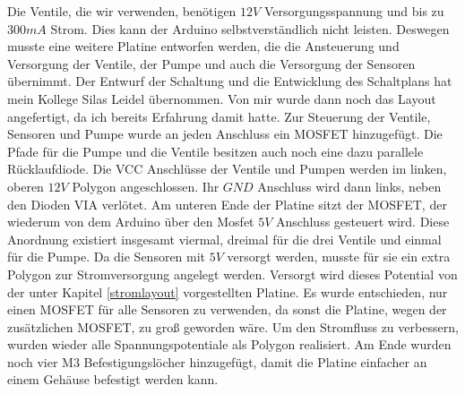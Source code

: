 Die Ventile, die wir verwenden, benötigen $12V$ Versorgungsspannung und bis zu $300mA$
Strom. Dies kann der Arduino selbstverständlich nicht leisten. Deswegen musste eine
weitere Platine entworfen werden, die die Ansteuerung und Versorgung der Ventile, der
Pumpe und auch die Versorgung der Sensoren übernimmt. Der Entwurf der Schaltung und
die Entwicklung des Schaltplans hat mein Kollege Silas Leidel übernommen. Von mir wurde
dann noch das Layout angefertigt, da ich bereits Erfahrung damit hatte. Zur Steuerung der
Ventile, Sensoren und Pumpe wurde an jeden Anschluss ein MOSFET hinzugefügt. Die Pfade
für die Pumpe und die Ventile besitzen auch noch eine dazu parallele Rücklaufdiode. Die VCC
Anschlüsse der Ventile und Pumpen werden im linken, oberen $12V$ Polygon
angeschlossen. Ihr $GND$ Anschluss wird dann links, neben den Dioden VIA verlötet. Am
unteren Ende der Platine sitzt der MOSFET, der wiederum von dem Arduino über den
Mosfet $5V$ Anschluss gesteuert wird. Diese Anordnung existiert insgesamt viermal, dreimal
für die drei Ventile und einmal für die Pumpe. Da die Sensoren mit $5V$ versorgt werden,
musste für sie ein extra Polygon zur Stromversorgung angelegt werden. Versorgt wird dieses
Potential von der unter Kapitel \ref{stromlayout} vorgestellten Platine. Es wurde entschieden,
nur einen MOSFET für alle Sensoren zu verwenden, da sonst die Platine, wegen der
zusätzlichen MOSFET, zu groß geworden wäre. Um den Stromfluss zu verbessern, wurden
wieder alle Spannungspotentiale als Polygon realisiert. Am Ende wurden noch vier M3
Befestigungslöcher hinzugefügt, damit die Platine einfacher an einem Gehäuse befestigt
werden kann.

